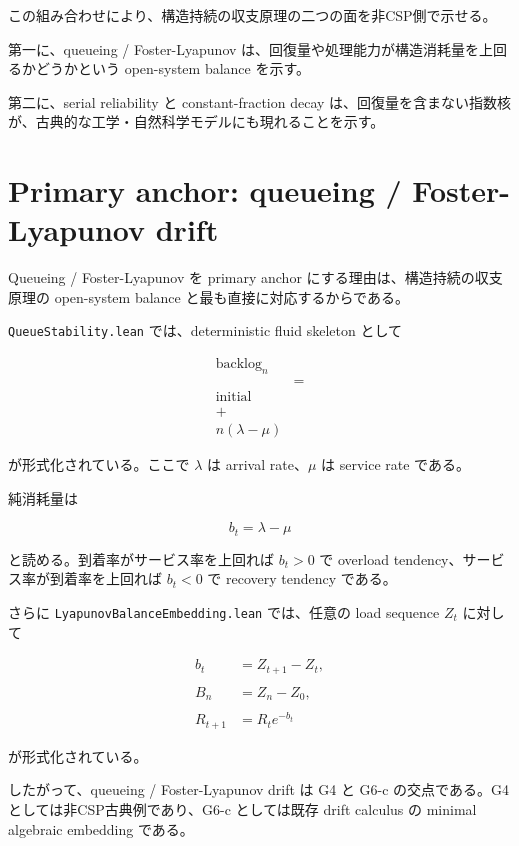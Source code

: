 \documentclass[12pt,a4paper]{article}
\begin{document}
この組み合わせにより、構造持続の収支原理の二つの面を非CSP側で示せる。

第一に、queueing / Foster-Lyapunov は、回復量や処理能力が構造消耗量を上回るかどうかという open-system balance を示す。

第二に、serial reliability と constant-fraction decay は、回復量を含まない指数核が、古典的な工学・自然科学モデルにも現れることを示す。

\section{Primary anchor: queueing / Foster-Lyapunov drift}\label{primary-anchor-queueing-foster-lyapunov-drift}

Queueing / Foster-Lyapunov を primary anchor にする理由は、構造持続の収支原理の open-system balance と最も直接に対応するからである。

\texttt{QueueStability.lean} では、deterministic fluid skeleton として

\[
\begin{aligned}
\mathrm{backlog}_n \\
&= \\
\mathrm{initial} \\
+ \\
n(\lambda-\mu)
\end{aligned}
\]

が形式化されている。ここで \(\lambda\) は arrival rate、\(\mu\) は service rate である。

純消耗量は

\[
b_{t}=\lambda-\mu
\]

と読める。到着率がサービス率を上回れば \(b_{t}>0\) で overload tendency、サービス率が到着率を上回れば \(b_{t}<0\) で recovery tendency である。

さらに \texttt{LyapunovBalanceEmbedding.lean} では、任意の load sequence \(Z_{t}\) に対して

\[
\begin{aligned}
b_{t}&=Z_{t+1}-Z_{t}, \\
\qquad \\
B_{n}&=Z_{n}-Z_0, \\
\qquad \\
R_{t+1}&=R_{t} e^{-b_{t}}
\end{aligned}
\]

が形式化されている。

したがって、queueing / Foster-Lyapunov drift は G4 と G6-c の交点である。G4 としては非CSP古典例であり、G6-c としては既存 drift calculus の minimal algebraic embedding である。
\end{document}
